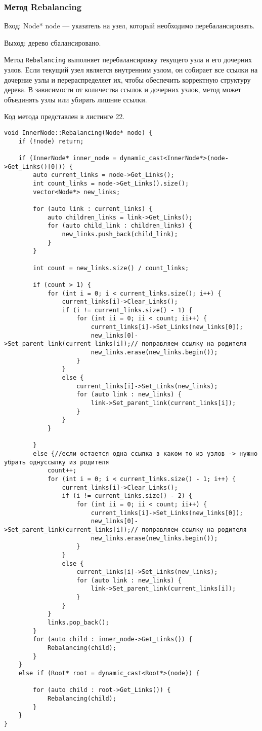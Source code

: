 \documentclass[10pt,a4paper,final]{article} %
\begin{document}
\subsubsection{Метод Rebalancing}
Вход: Node* node — указатель на узел, который необходимо перебалансировать. \par
Выход: дерево сбалансировано. \par
\par Метод \texttt{Rebalancing} выполняет перебалансировку текущего узла и его дочерних узлов. Если текущий узел является внутренним узлом, он собирает все ссылки на дочерние узлы и перераспределяет их, чтобы обеспечить корректную структуру дерева. В зависимости от количества ссылок и дочерних узлов, метод может объединять узлы или убирать лишние ссылки.

Код метода представлен в листинге 22. \begin{lstlisting}[label=rebalancingInnerNodeMethod, caption = Метод Rebalancing для класса InnerNode] 
void InnerNode::Rebalancing(Node* node) {
	if (!node) return;
	
	if (InnerNode* inner_node = dynamic_cast<InnerNode*>(node->Get_Links()[0])) {
		auto current_links = node->Get_Links();
		int count_links = node->Get_Links().size();
		vector<Node*> new_links;
		
		for (auto link : current_links) {
			auto children_links = link->Get_Links();
			for (auto child_link : children_links) {
				new_links.push_back(child_link);
			}
		}
		
		int count = new_links.size() / count_links;
		
		if (count > 1) {
			for (int i = 0; i < current_links.size(); i++) {
				current_links[i]->Clear_Links();
				if (i != current_links.size() - 1) {
					for (int ii = 0; ii < count; ii++) {
						current_links[i]->Set_Links(new_links[0]);
						new_links[0]->Set_parent_link(current_links[i]);// поправляем ссылку на родителя
						new_links.erase(new_links.begin());
					}
				}
				else {
					current_links[i]->Set_Links(new_links);
					for (auto link : new_links) {
						link->Set_parent_link(current_links[i]);
					}
				}
			}
			
		}
		else {//если остается одна ссылка в каком то из узлов -> нужно убрать однуссылку из родителя
			count++;
			for (int i = 0; i < current_links.size() - 1; i++) {
				current_links[i]->Clear_Links();
				if (i != current_links.size() - 2) {
					for (int ii = 0; ii < count; ii++) {
						current_links[i]->Set_Links(new_links[0]);
						new_links[0]->Set_parent_link(current_links[i]);// поправляем ссылку на родителя
						new_links.erase(new_links.begin());
					}
				}
				else {
					current_links[i]->Set_Links(new_links);
					for (auto link : new_links) {
						link->Set_parent_link(current_links[i]);
					}
				}
			}
			links.pop_back();
		}
		for (auto child : inner_node->Get_Links()) {
			Rebalancing(child);
		}
	}
	else if (Root* root = dynamic_cast<Root*>(node)) {
		
		for (auto child : root->Get_Links()) {
			Rebalancing(child);
		}
	}
}\end{lstlisting}
\end{document}
